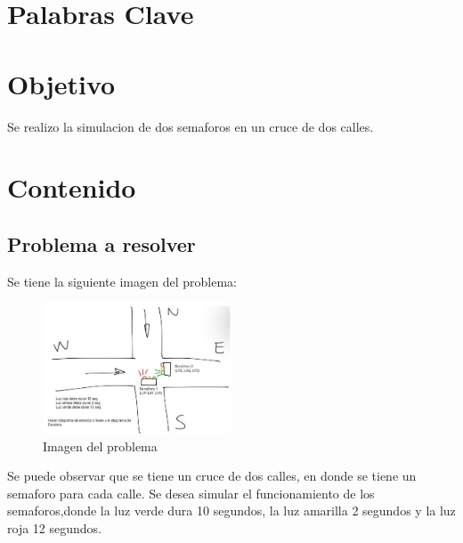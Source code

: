 \documentclass[12pt]{report}
\begin{document}
\tableofcontents
\newpage

\chapter*{Palabras Clave}
 



\newpage

\chapter*{Objetivo}
  Se realizo la simulacion de dos semaforos en un cruce de dos calles.
\newpage

\chapter{Contenido}
\section{Problema a resolver}
  Se tiene la siguiente imagen del problema:
  \begin{figure}[H]
    \centering
    \includegraphics[width=0.5\textwidth]{screenshots/problema.png}
    \caption{Imagen del problema}
    \label{fig:imagen}
  \end{figure}
  Se puede observar que se tiene un cruce de dos calles, en donde se tiene un semaforo para cada calle. Se desea simular el funcionamiento de los semaforos,donde la luz verde dura 10 segundos, la luz amarilla 2 segundos y la luz roja 12 segundos.
\end{document}
